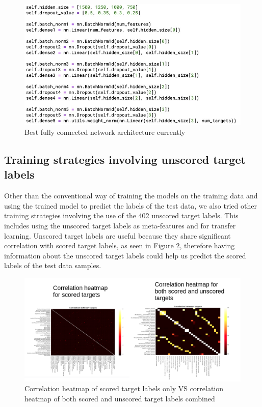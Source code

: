 \documentclass{article}
\begin{document}
\begin{figure}[H]
\begin{center}
	\includegraphics[width=1\textwidth]{pics/fcn.JPG}
    \caption{Best fully connected network architecture currently}
\label{fig:fcn}
\end{center}
\end{figure}


\subsection{Training strategies involving unscored target labels}
Other than the conventional way of training the models on the training data and using the trained model to predict the labels of the test data, we also tried other training strategies involving the use of the 402 unscored target labels. This includes using the unscored target labels as meta-features and for transfer learning. Unscored target labels are useful because they share significant correlation with scored target labels, as seen in Figure \ref{fig:scored_unscored_corr}, therefore having information about the unscored target labels could help us predict the scored labels of the test data samples.

\begin{figure}[H]
\begin{center}
	\includegraphics[width=1\textwidth]{pics/scored_unscored_corr.png}
    \caption{Correlation heatmap of scored target labels only VS correlation heatmap of both scored and unscored target labels combined}
\label{fig:scored_unscored_corr}
\end{center}
\end{figure}
\end{document}
